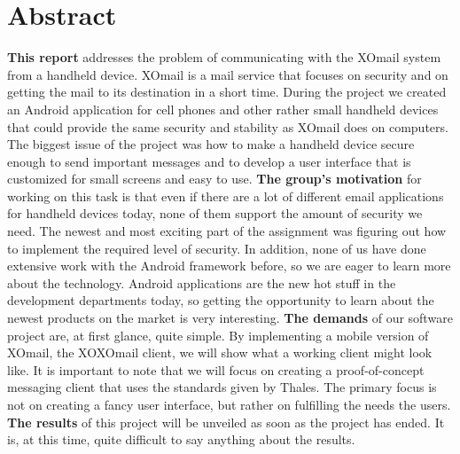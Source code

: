 
\chapter*{Abstract}

\textbf{This report} addresses the problem of communicating with the XOmail system from a handheld device. XOmail is a mail service that focuses on security and on getting the mail to its destination in a short time. During the project we created an Android application for cell phones and other rather small handheld devices that could provide the same security and stability as XOmail does on computers. The biggest issue of the project was how to make a handheld device secure enough to send important messages and to develop a user interface that is customized for small screens and easy to use. 
\newline
\newline
\textbf{The group’s motivation} for working on this task is that even if there are a lot of different email applications for handheld devices today, none of them support the amount of security we need. The newest and most exciting part of the assignment was figuring out how to implement the required level of security. In addition, none of us have done extensive work with the Android framework before, so we are eager to learn more about the technology. Android applications are the new hot stuff in the development departments today, so getting the opportunity to learn about the newest products on the market is very interesting. 
\newline
\newline
\textbf{The demands} of our software project are, at first glance, quite simple. By implementing a mobile version of XOmail, the XOXOmail client, we will show what a working client might look like. It is important to note that we will focus on creating a proof-of-concept messaging client that uses the standards given by Thales. The primary focus is not on creating a fancy user interface, but rather on fulfilling the needs the users. 
\newline
\newline
\textbf{The results} of this project will be unveiled as soon as the project has ended. It is, at this time, quite difficult to say anything about the results.

